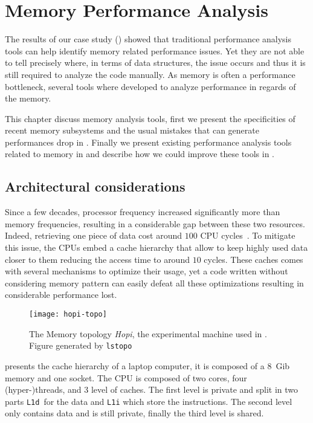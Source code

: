 \chapter{Memory Performance Analysis}

The results of our case study () showed that traditional performance analysis tools can help identify memory related performance issues.
Yet they are not able to tell precisely where, in terms of data structures, the issue occurs and thus it is still required to analyze the code manually.
As memory is often a performance bottleneck, several tools where developed to analyze performance in regards of the memory.

This chapter discuss memory analysis tools, first we present the specificities of recent memory subsystems and the usual mistakes that can generate performances drop in .
Finally we present existing performance analysis tools related to memory in  and describe how we could improve these tools in .

\section{Architectural considerations}
\label{sec:archi}

Since a few decades, processor frequency increased significantly more than memory frequencies, resulting in a considerable gap between these two resources.
Indeed, retrieving one piece of data cost around $100$ \gls{CPU} cycles~\cite{Drepper07What}.
To mitigate this issue, the \glspl{CPU} embed a cache hierarchy that allow to keep highly used data closer to them reducing the access time to around $10$ cycles.
These caches comes with several mechanisms to optimize their usage, yet a code written without considering memory pattern can easily defeat all these optimizations resulting in considerable performance lost.

\begin{figure}[htb]
    \centering
    \texttt{[image: hopi-topo]}
    \caption[Hopi topology]{The Memory topology \emph{Hopi}, the experimental machine used in .\\
        Figure generated by \texttt{lstopo}}
    \label{fig:hopi-topo}
\end{figure}

 presents the cache hierarchy of a laptop computer, it is composed of a \SI{8}{Gib} memory and one socket.
The \gls{CPU} is composed of two cores, four (hyper-)threads, and 3 level of caches.
The first level is private and split in two parts \texttt{L1d} for the data and \texttt{L1i} which store the instructions.
The second level only contains data and is still private, finally the third level is shared.


